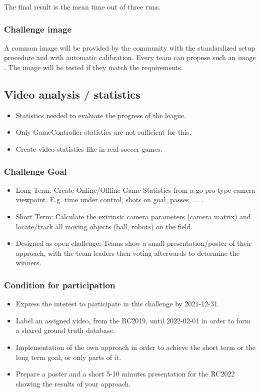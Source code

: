     The final result is the mean time out of three runs.

    \subsubsection{Challenge image}
        \label{sec:Challenge_image}
        A common image will be provided by the community with the standardized setup procedure and with automatic calibration. Every team can propose such an image . The image will be tested if they match the requirements. 

\subsection{Video analysis / statistics}
\begin{itemize}
    \item Statistics needed to evaluate the progress of the league.
    \item Only GameController statistics are not sufficient for this.
    \item Create video statistics like in real soccer games.
\end{itemize}

    \subsubsection{Challenge Goal}
    \begin{itemize}
        \item Long Term: Create Online/Offline Game Statistics from a go-pro type camera viewpoint. E.g. time under control, shots on goal, passes, ... .
        \item Short Term: Calculate the extrinsic camera parameters (camera matrix) and locate/track all moving objects (ball, robots) on the field.
        \item Designed as open challenge: Teams show a small presentation/poster of their approach, with the team leaders then voting afterwards to determine the winners.
    \end{itemize}

    \subsubsection{Condition for participation}
        \begin{itemize}
            \item Express the interest to participate in this challenge by 2021-12-31.
            \item Label an assigned video, from the RC2019, until 2022-02-01  in order to form a shared ground truth database.
            \item Implementation of the own approach in order to achieve the short term or the long term goal, or only parts of it.
            \item Prepare a poster and a short 5-10 minutes presentation for the RC2022 showing the results of your approach.
        \end{itemize}

